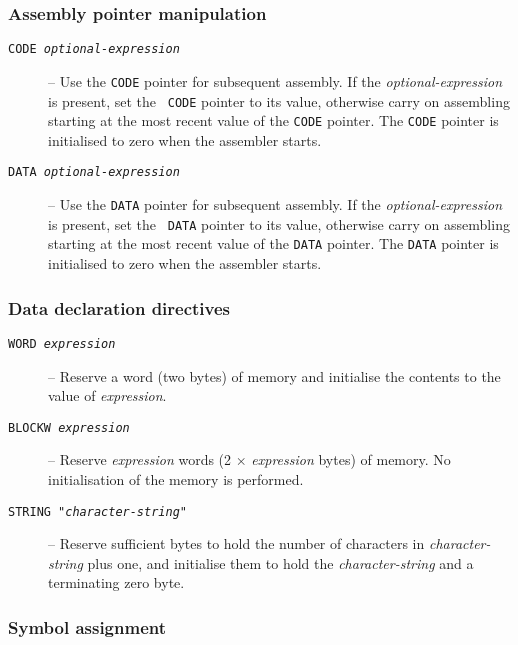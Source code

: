 \subsubsection{Assembly pointer manipulation}
\begin{description}
\item[{\tt CODE {\em optional-expression}}]
--
Use the {\tt CODE} pointer for
subsequent assembly. If the {\em optional-expression} is present, set the {\tt
CODE} pointer to its value, otherwise carry on assembling starting at the most recent value 
of the {\tt CODE} pointer. The {\tt CODE} pointer is initialised to zero when the assembler 
starts.

\item[{\tt DATA {\em optional-expression}}]
--
Use the {\tt DATA} pointer for
subsequent assembly. If the {\em optional-expression} is present, set the {\tt
DATA} pointer to its value, otherwise carry on assembling starting at the most recent value 
of the {\tt DATA} pointer. The {\tt DATA} pointer is initialised to zero when the assembler 
starts.

\end{description}

\subsubsection{Data declaration directives}
\begin{description}

\item[{\tt WORD {\em expression}}]
--
Reserve a word (two bytes) of memory and
initialise the contents to the value of {\em expression}.

\item[{\tt BLOCKW {\em expression}}]
--
Reserve {\em expression} words (2 $\times$
{\em expression} bytes) of memory. No initialisation of the memory is performed.

\item[{\tt STRING "{\em character-string\/}"}]
--
Reserve sufficient bytes to hold
the number of characters in {\em character-string} plus one, and
initialise them to hold the {\em character-string} and a terminating
zero byte.
\end{description}

\subsubsection{Symbol assignment}

